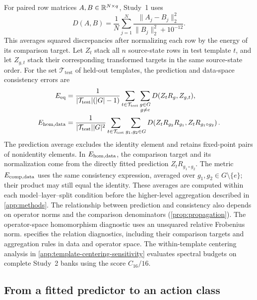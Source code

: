 For paired row matrices $A,B\in\mathbb{R}^{N\times q}$, Study~1 uses
\begin{equation}
 D(A,B)=\frac1N\sum_{j=1}^{N}
 \frac{\|A_j-B_j\|_2^2}{\|B_j\|_2^2+10^{-12}}.
 \label{eq:D}
\end{equation}
This averages squared discrepancies after normalizing each
row by the energy of its comparison target.
Let $Z_t$ stack all $n$ source-state rows in test template $t$,
and let $Z_{g,t}$ stack their corresponding transformed targets
in the same source-state order.
For the set $\mathcal T_{\mathrm{test}}$ of held-out templates,
the prediction and data-space consistency errors are
\begin{align*}
 E_{\mathrm{eq}}
 &=
 \frac{1}{|\mathcal T_{\mathrm{test}}|(|G|-1)}
 \sum_{t\in\mathcal T_{\mathrm{test}}}
 \sum_{\substack{g\in G\\g\ne e}}
 D(Z_tR_g,Z_{g,t}),\\
 E_{\mathrm{hom,data}}
 &=
 \frac{1}{|\mathcal T_{\mathrm{test}}||G|^2}
 \sum_{t\in\mathcal T_{\mathrm{test}}}
 \sum_{g_1,g_2\in G}
 D\!\left(
   Z_tR_{g_2}R_{g_1},
   Z_tR_{g_1\circ g_2}
 \right).
\end{align*}
The prediction average excludes the identity element and
retains fixed-point pairs of nonidentity elements.
In $E_{\mathrm{hom,data}}$, the comparison target and its normalization
come from the directly fitted prediction
$Z_tR_{g_1\circ g_2}$.
The metric $E_{\mathrm{comp,data}}$ uses the same consistency expression,
averaged over $g_1,g_2\in G\setminus\{e\}$;
their product may still equal the identity.
These averages are computed within each model--layer--split
condition before the higher-level aggregation described in
\cref{app:methods}.
The relationship between prediction and consistency also
depends on operator norms and the comparison denominators
(\cref{prop:propagation}).
The operator-space homomorphism diagnostic uses an unsquared
relative Frobenius norm.
 specifies the relation diagnostics,
including their comparison targets and aggregation rules
in data and operator space.
The within-template centering analysis in
\cref{app:template-centering-sensitivity} evaluates spectral
budgets on complete Study~2 banks using the score $C_{16}/16$.

\subsection{From a fitted predictor to an action class}

